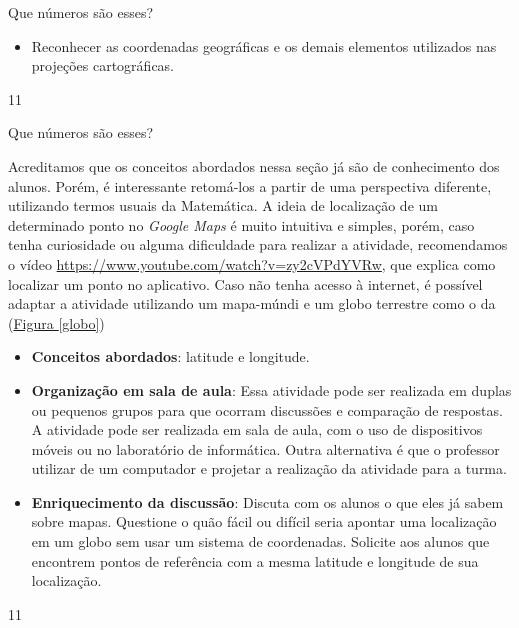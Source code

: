 \def\currentcolor{session1}
\begin{objectives}{Que números são esses?}
{
  \begin{itemize}
  \item Reconhecer as coordenadas geográficas e os demais elementos utilizados nas projeções cartográficas.
  
  \end{itemize}
}{1}{1}
\end{objectives}
\begin{sugestions}{Que números são esses?}
{
Acreditamos que os conceitos abordados nessa seção já são de conhecimento dos alunos. Porém, é interessante retomá-los a partir de uma perspectiva diferente, utilizando termos usuais da Matemática. A ideia de localização de um determinado ponto no \textit{Google Maps} é muito intuitiva e simples, porém, caso tenha curiosidade ou alguma dificuldade para realizar a atividade, recomendamos o vídeo \url{https://www.youtube.com/watch?v=zy2cVPdYVRw}, que explica como localizar um ponto no aplicativo. Caso não tenha acesso à internet, é possível adaptar a atividade utilizando um mapa-múndi e um globo terrestre como o da (\hyperref[globo]{Figura \ref{globo}})

\begin{itemize}
\item \textbf{Conceitos abordados}: latitude e longitude.
\item \textbf{Organização em sala de aula}: Essa atividade pode ser realizada em duplas ou pequenos grupos para que ocorram discussões e comparação de respostas. A atividade pode ser realizada em sala de aula, com o uso de dispositivos móveis ou no laboratório de informática. Outra alternativa é que o professor utilizar de um computador e projetar a realização da atividade para a turma.
\item \textbf{Enriquecimento da discussão}: Discuta com os alunos o que eles já sabem sobre mapas. Questione o quão fácil ou difícil seria apontar uma localização em um globo sem usar um sistema de coordenadas. Solicite aos alunos que encontrem pontos de referência com a mesma latitude e longitude de sua localização.
\end{itemize}
}{1}{1}
\end{sugestions}
